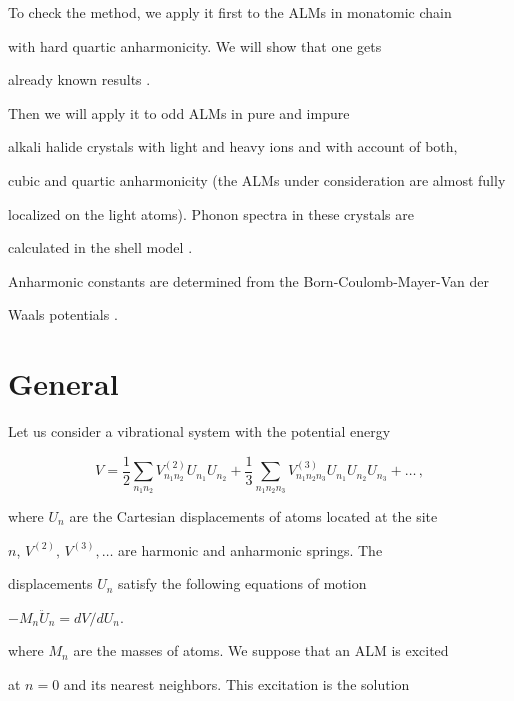 To check the method, we apply it first to the ALMs in monatomic chain 

with hard quartic anharmonicity. We will show that one gets

already known results \cite{sivtak,page}.

Then we will apply it to odd ALMs in pure and impure  

alkali halide crystals with light and heavy ions and with account of both,  

cubic and quartic anharmonicity (the ALMs under consideration are almost fully

localized on the light atoms). Phonon spectra in these crystals are 

calculated in the shell model \cite{shell,bilz,kristofel}.

Anharmonic constants are determined from the Born-Coulomb-Mayer-Van der

Waals potentials \cite{potential}. 



\section{General} 

Let us consider a vibrational system with the potential energy  

\begin{equation} 

{V} = \frac{1}{2} \sum_{n_{1} n_{2}}\!{V^{(2)}_{n_{1} n_{2}} 

{U}_{n_{1}} {U} _{n_{2}}} 

+ \frac{1}{3}\! \sum_{n_{1} n_{2} n_{3}}\!\!{V^{(3)}_{n_{1} n_{2} n_{3}} 

{U}_{n_{1}} {U}_{n_{2}} {U}_{n_{3}}} + \ldots\,, 

\label{eq:v} 

\end{equation} 

where ${U}_{n}$ are the Cartesian displacements of atoms located at the site 

$n$, $V^{(2)},\, V^{(3)},\ldots$ are harmonic and anharmonic springs. The 

displacements $U_n$ satisfy the following equations of motion 

$ - M_n \ddot{U}_n = dV/dU_n$.

where $M_{n}$ are the masses of atoms. We suppose that an ALM is excited

at $n=0$ and its nearest neighbors. This excitation is the solution 

